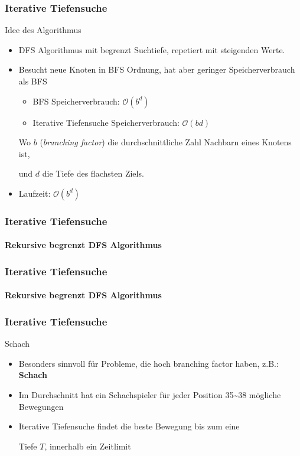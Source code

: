\begin{frame}
	\frametitle{Iterative Tiefensuche}
	\begin{KITinfoblock}{Idee des Algorithmus}
	\begin{itemize}
		\item DFS Algorithmus mit begrenzt Suchtiefe, repetiert mit steigenden Werte.
		\item Besucht neue Knoten in BFS Ordnung, hat aber geringer Speicherverbrauch als BFS
		\begin{itemize}		
			\item BFS Speicherverbrauch: $\mathcal{O}(b^d)$
			\item Iterative Tiefensuche Speicherverbrauch: $\mathcal{O}(bd)$
		\end{itemize}
		Wo $b$ (\textit{branching factor}) die durchschnittliche Zahl Nachbarn eines Knotens ist,
	
		und $d$ die Tiefe des flachsten Ziels.
		\item Laufzeit: $\mathcal{O}(b^d)$
	\end{itemize}
	\end{KITinfoblock}

\end{frame}

	
\begin{frame}
	\frametitle{Iterative Tiefensuche}
	\framesubtitle{Rekursive begrenzt DFS Algorithmus}
		
\end{frame}

\begin{frame}
	\frametitle{Iterative Tiefensuche}
	\framesubtitle{Rekursive begrenzt DFS Algorithmus}
		
\end{frame}

\begin{frame}
	\frametitle{Iterative Tiefensuche}
	\begin{KITexampleblock}{Schach}
		\begin{itemize}
			\item Besonders sinnvoll für Probleme, die hoch branching factor haben, z.B.: \textbf{Schach}
			\item Im Durchschnitt hat ein Schachspieler für jeder Position 35\textasciitilde38 mögliche Bewegungen
			\item Iterative Tiefensuche findet die beste Bewegung bis zum eine 
			
			Tiefe $T$, innerhalb ein Zeitlimit
		\end{itemize}
	\end{KITexampleblock}
\end{frame}

